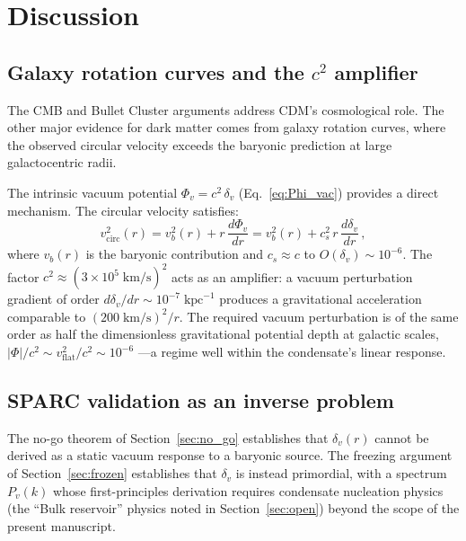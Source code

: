 \documentclass[12pt, a4paper]{article}
\begin{document}
\section{Discussion}
\label{sec:discussion}

\subsection{Galaxy rotation curves and the \texorpdfstring{$c^2$}{c²} amplifier}
\label{sec:rotation}
The CMB and Bullet Cluster arguments address CDM's cosmological role. The other major evidence for dark matter comes from galaxy rotation curves, where the observed circular velocity exceeds the baryonic prediction at large galactocentric radii.

The intrinsic vacuum potential $\Phi_v = c^2\,\delta_v$ (Eq.~\ref{eq:Phi_vac}) provides a direct mechanism. The circular velocity satisfies:
\begin{equation}
    v_{\mathrm{circ}}^2(r) = v_b^2(r)
    + r\,\frac{d\Phi_v}{dr}
    = v_b^2(r) + c_s^2\,r\,\frac{d\delta_v}{dr}\,,
\label{eq:v_circ}
\end{equation}
where $v_b(r)$ is the baryonic contribution and $c_s \approx c$ to $O(\delta_v) \sim 10^{-6}$. The factor $c^2 \approx (3 \times 10^5\;\mathrm{km/s})^2$ acts as an amplifier: a vacuum perturbation gradient of order $d\delta_v/dr \sim 10^{-7}\;\mathrm{kpc}^{-1}$ produces a gravitational acceleration comparable to $(200\;\mathrm{km/s})^2/r$. The required vacuum perturbation is of the same order as half the dimensionless gravitational potential depth at galactic scales, $|\Phi|/c^2 \sim v_{\mathrm{flat}}^2/c^2 \sim 10^{-6}$ ---a regime well within the condensate's linear response.

\subsection{SPARC validation as an inverse problem}

The no-go theorem of Section~\ref{sec:no_go} establishes that $\delta_v(r)$ cannot be derived as a static vacuum response to a baryonic source. The freezing argument of Section~\ref{sec:frozen} establishes that $\delta_v$ is instead primordial, with a spectrum $P_v(k)$ whose first-principles derivation requires condensate nucleation physics (the ``Bulk reservoir'' physics noted in Section~\ref{sec:open}) beyond the scope of the present manuscript.
\end{document}

